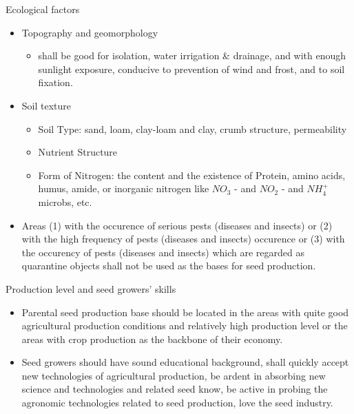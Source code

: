 \documentclass[11pt,dvipsnames,ignorenonframetext,aspectratio=169]{beamer}
\providecommand{\tightlist}{%
  \setlength{\itemsep}{0pt}\setlength{\parskip}{0pt}}
\begin{document}
\begin{frame}{Ecological factors}
\protect\hypertarget{ecological-factors}{}

\begin{itemize}
\tightlist
\item
  Topography and geomorphology

  \begin{itemize}
  \tightlist
  \item
    shall be good for isolation, water irrigation \& drainage, and with
    enough sunlight exposure, conducive to prevention of wind and frost,
    and to soil fixation.
  \end{itemize}
\item
  Soil texture

  \begin{itemize}
  \tightlist
  \item
    Soil Type: sand, loam, clay-loam and clay, crumb structure,
    permeability\\
  \item
    Nutrient Structure
  \item
    Form of Nitrogen: the content and the existence of Protein, amino
    acids, humus, amide, or inorganic nitrogen like \(NO_3\) - and
    \(NO_2\) - and \(NH_4^+\) microbs, etc.
  \end{itemize}
\item
  Areas (1) with the occurence of serious pests (diseases and insects)
  or (2) with the high frequency of pests (diseases and insects)
  occurence or (3) with the occurency of pests (diseases and insects)
  which are regarded as quarantine objects shall not be used as the
  bases for seed production.
\end{itemize}

\end{frame}

\begin{frame}{Production level and seed growers' skills}
\protect\hypertarget{production-level-and-seed-growers-skills}{}

\begin{itemize}
\tightlist
\item
  Parental seed production base should be located in the areas with
  quite good agricultural production conditions and relatively high
  production level or the areas with crop production as the backbone of
  their economy.
\item
  Seed growers should have sound educational background, shall quickly
  accept new technologies of agricultural production, be ardent in
  absorbing new science and technologies and related seed know, be
  active in probing the agronomic technologies related to seed
  production, love the seed industry.
\end{itemize}

\end{frame}
\end{document}
